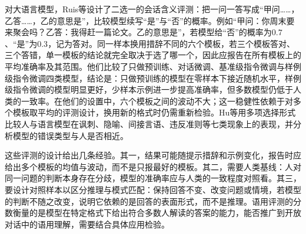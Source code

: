 对大语言模型，Ruis等设计了二选一的会话含义评测：把一问一答写成“甲问……，乙答……，乙的意思是”，比较模型续写“是”与“否”的概率。例如“甲问：你周末要来聚会吗？乙答：我得赶一篇论文。乙的意思是”，若模型给“否”的概率为$0.7$、“是”为$0.3$，记为答对。同一样本换用措辞不同的六个模板，若三个模板答对、三个答错，单一模板的结论就完全取决于选了哪一个，因此应报告在所有模板上的平均准确率及其范围。他们比较了只做预训练、对话微调、基准级指令微调与样例级指令微调四类模型，结论是：只做预训练的模型在零样本下接近随机水平，样例级指令微调的模型明显更好，少样本示例进一步提高准确率，但多数模型仍低于人类的一致率。在他们的设置中，六个模板之间的波动不大；这一稳健性依赖于对多个模板取平均的评测设计，换用新的格式时仍需重新检验。Hu等用多项选择形式比较人与语言模型在讽刺、隐喻、间接言语、违反准则等七类现象上的表现，并分析模型的错误类型与人是否相近。

这些评测的设计给出几条经验。其一，结果可能随提示措辞和示例变化，报告时应给出多个模板的均值与波动，而不是只报最好的模板。其二，需要人类基线：人对同一问题的判断本身存在分歧，模型的准确率应与人类的一致程度对照看。其三，要设计对照样本以区分推理与模式匹配：保持回答不变、改变问题或情境，若模型的判断不随之改变，说明它依赖的是回答的表面形式，而不是推理。语用评测的分数衡量的是模型在特定格式下给出符合多数人解读的答案的能力，能否推广到开放对话中的语用理解，需要结合具体应用检验。
